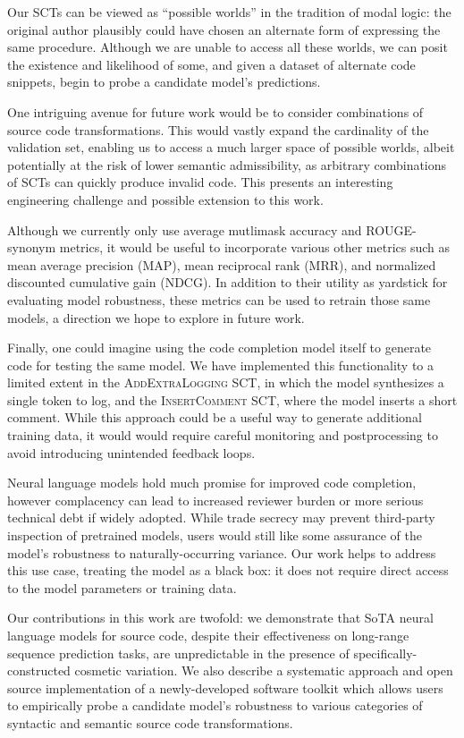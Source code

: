 \documentclass[usenames,dvipsnames]{article} %
\begin{document}
  Our SCTs can be viewed as ``possible worlds'' in the tradition of modal logic: the original author plausibly could have chosen an alternate form of expressing the same procedure. Although we are unable to access all these worlds, we can posit the existence and likelihood of some, and given a dataset of alternate code snippets, begin to probe a candidate model's predictions.

  One intriguing avenue for future work would be to consider combinations of source code transformations. This would vastly expand the cardinality of the validation set, enabling us to access a much larger space of possible worlds, albeit potentially at the risk of lower semantic admissibility, as arbitrary combinations of SCTs can quickly produce invalid code. This presents an interesting engineering challenge and possible extension to this work.

  Although we currently only use average mutlimask accuracy and ROUGE-synonym metrics, it would be useful to incorporate various other metrics such as mean average precision (MAP), mean reciprocal rank (MRR), and normalized discounted cumulative gain (NDCG). In addition to their utility as yardstick for evaluating model robustness, these metrics can be used to retrain those same models, a direction we hope to explore in future work.

  Finally, one could imagine using the code completion model itself to generate code for testing the same model. We have implemented this functionality to a limited extent in the \textsc{AddExtraLogging} SCT, in which the model synthesizes a single token to log, and the \textsc{InsertComment} SCT, where the model inserts a short comment. While this approach could be a useful way to generate additional training data, it would would require careful monitoring and postprocessing to avoid introducing unintended feedback loops.

  Neural language models hold much promise for improved code completion, however complacency can lead to increased reviewer burden or more serious technical debt if widely adopted. While trade secrecy may prevent third-party inspection of pretrained models, users would still like some assurance of the model's robustness to naturally-occurring variance. Our work helps to address this use case, treating the model as a black box: it does not require direct access to the model parameters or training data.

  Our contributions in this work are twofold: we demonstrate that SoTA neural language models for source code, despite their effectiveness on long-range sequence prediction tasks, are unpredictable in the presence of specifically-constructed cosmetic variation. We also describe a systematic approach and open source implementation of a newly-developed software toolkit which allows users to empirically probe a candidate model's robustness to various categories of syntactic and semantic source code transformations.
  \pagebreak
  
  \appendix
\end{document}
